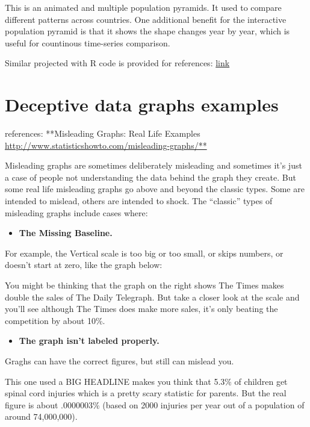 \documentclass[]{book}
\providecommand{\tightlist}{%
  \setlength{\itemsep}{0pt}\setlength{\parskip}{0pt}}
\theoremstyle{definition}
\theoremstyle{definition}
\theoremstyle{definition}
\theoremstyle{remark}
\begin{document}
This is an animated and multiple population pyramids. It used to compare
different patterns across countries. One additional benefit for the
interactive population pyramid is that it shows the shape changes year
by year, which is useful for countinous time-series comparison.

Similar projected with R code is provided for references:
\href{https://www.r-bloggers.com/who-is-old-visualizing-the-concept-of-prospective-ageing-with-animated-population-pyramids/}{link}

\section{Deceptive data graphs
examples}\label{deceptive-data-graphs-examples}

references: **Misleading Graphs: Real Life Examples
\url{http://www.statisticshowto.com/misleading-graphs/**}

Misleading graphs are sometimes deliberately misleading and sometimes
it's just a case of people not understanding the data behind the graph
they create. But some real life misleading graphs go above and beyond
the classic types. Some are intended to mislead, others are intended to
shock. The ``classic'' types of misleading graphs include cases where:

\begin{itemize}
\tightlist
\item
  \textbf{The Missing Baseline.}
\end{itemize}

For example, the Vertical scale is too big or too small, or skips
numbers, or doesn't start at zero, like the graph below:

You might be thinking that the graph on the right shows The Times makes
double the sales of The Daily Telegraph. But take a closer look at the
scale and you'll see although The Times does make more sales, it's only
beating the competition by about 10\%.

\begin{itemize}
\tightlist
\item
  \textbf{The graph isn't labeled properly.}
\end{itemize}

Graghs can have the correct figures, but still can mislead you.

This one used a BIG HEADLINE makes you think that 5.3\% of children get
spinal cord injuries which is a pretty scary statistic for parents. But
the real figure is about .0000003\% (based on 2000 injuries per year out
of a population of around 74,000,000).
\end{document}
